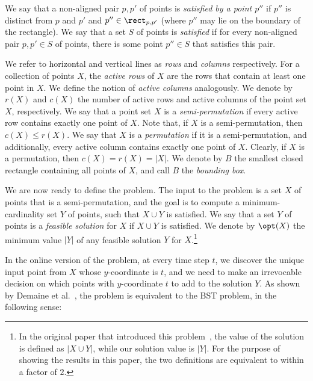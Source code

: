 	\begin{definition}
	We say that a non-aligned pair $p,p'$ of points is \emph{satisfied by a point $p''$} if $p''$ is distinct from $p$ and $p'$ and $p''\in \rect_{p,p'}$ (where $p''$ may lie on the boundary of the rectangle).
	We say that a set $S$ of points is \emph{satisfied} if for every non-aligned pair $p,p'\in S$ of points, there is some point $p''\in S$ that satisfies this pair.
	\end{definition}

	We refer to horizontal and vertical lines as \emph{rows} and \emph{columns} respectively. 
	For a collection of points $X$, the \textit{active rows} of $X$ are the rows that contain at least one point in $X$. We define the notion of \textit{active columns} analogously. 
	We denote by $r(X)$ and $c(X)$ the number of active rows and active columns of the point set $X$, respectively.
	We say that a point set $X$ is a \emph{semi-permutation} if every active row contains exactly one point of $X$.
	Note that, if $X$ is a semi-permutation, then $c(X) \le r(X)$. We say that $X$ is a \emph{permutation} if it is a semi-permutation, and additionally, every active column contains exactly one point of $X$.  
	Clearly,  if $X$ is a permutation, then $c(X)=r(X)=|X|$. 
	We denote by  $B$ the smallest closed rectangle containing all points of $X$, and call $B$ the \emph{bounding box}.
%

	We are now ready to define the  \minsat problem. 
%
%
The input to the problem is a set $X$ of points that is a semi-permutation, and the goal is to compute a minimum-cardinality set $Y$ of points, such that $X\cup Y$ is satisfied.  
	We say that a set $Y$ of points is a \emph{feasible solution} for $X$ if $X\cup Y$ is satisfied. We denote by $\opt(X)$ the minimum value $|Y|$ of any feasible solution $Y$ for $X$.\footnote{In the original paper that introduced this problem~\cite{DHIKP09}, the value of the solution is defined as $|X \cup Y|$, while our solution value is $|Y|$. For the purpose of showing the results in this paper, the two definitions are equivalent to within a factor of $2$.}
	
%
%
%
%
%
%
In the online version of the \minsat problem, at every time step $t$, we discover the unique input point from $X$ whose $y$-coordinate is $t$, and we need to make an irrevocable decision on which points with $y$-coordinate $t$ to add to the solution $Y$.
%
%
As shown by Demaine et al.~\cite{DHIKP09},
the \minsat problem is equivalent to the BST problem, in the following sense:
%

